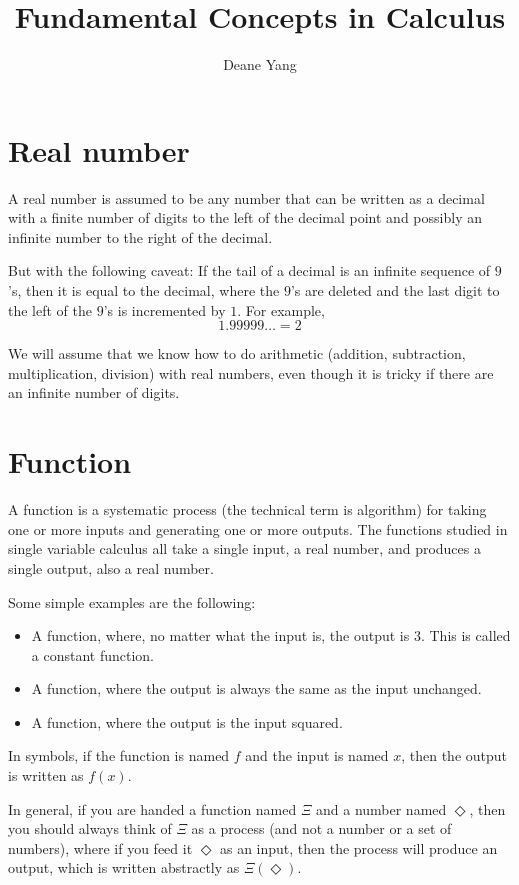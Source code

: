 \documentclass{math-deane}
\title{Fundamental Concepts in Calculus}
\author{Deane Yang}
\begin{document}
\maketitle

\section{Real number}

A real number is assumed to be any number that can be written as a decimal with a finite number of digits to the left of the decimal point and possibly an infinite number to the right of the decimal.

But with the following caveat: If the tail of a decimal is an infinite sequence of $9$'s, then it is equal to the decimal, where the $9$'s are deleted and the last digit to the left of the $9$'s is incremented by $1$. For example,
\[ 1.99999\dots = 2 \]

We will assume that we know how to do arithmetic (addition, subtraction, multiplication, division) with real numbers, even though it is tricky if there are an infinite number of digits.

\section{Function}

A function is a systematic process (the technical term is algorithm) for taking one or more inputs and generating one or more outputs. The functions studied in single variable calculus all take a single input, a real number, and produces a single output, also a real number.

Some simple examples are the following:
\begin{itemize}
\item A function, where, no matter what the input is, the output is $3$. This is called a constant function.
\item A function, where the output is always the same as the input unchanged.
\item A function, where the output is the input squared.
\end{itemize}

In symbols, if the function is named $f$ and the input is named $x$, then the output is written as $f(x)$.

In general, if you are handed a function named $\Xi$ and a number named $\Diamond$, then you should always think of $\Xi$ as a process (and not a number or a set of numbers), where if you feed it $\Diamond$ as an input, then the process will produce an output, which is written abstractly as $\Xi(\Diamond)$.
\end{document}
